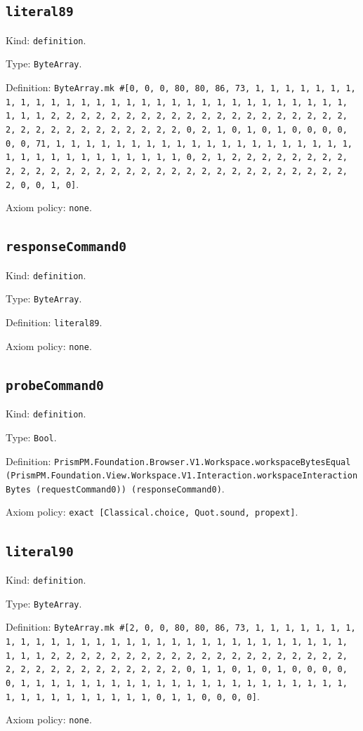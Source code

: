 \documentclass[11pt]{article}
\begin{document}
\subsection*{\texttt{literal89}}
\noindent Kind: \texttt{definition}.\par
\noindent Type: \texttt{ByteArray}.\par
\noindent Definition: \texttt{ByteArray.mk \#[0, 0, 0, 80, 80, 86, 73, 1, 1, 1, 1, 1, 1, 1, 1, 1, 1, 1, 1, 1, 1, 1, 1, 1, 1, 1, 1, 1, 1, 1, 1, 1, 1, 1, 1, 1, 1, 1, 1, 1, 2, 2, 2, 2, 2, 2, 2, 2, 2, 2, 2, 2, 2, 2, 2, 2, 2, 2, 2, 2, 2, 2, 2, 2, 2, 2, 2, 2, 2, 2, 2, 2, 0, 2, 1, 0, 1, 0, 1, 0, 0, 0, 0, 0, 0, 71, 1, 1, 1, 1, 1, 1, 1, 1, 1, 1, 1, 1, 1, 1, 1, 1, 1, 1, 1, 1, 1, 1, 1, 1, 1, 1, 1, 1, 1, 1, 1, 1, 0, 2, 1, 2, 2, 2, 2, 2, 2, 2, 2, 2, 2, 2, 2, 2, 2, 2, 2, 2, 2, 2, 2, 2, 2, 2, 2, 2, 2, 2, 2, 2, 2, 2, 2, 0, 0, 1, 0]}.\par
\noindent Axiom policy: \texttt{none}.\par
\subsection*{\texttt{responseCommand0}}
\noindent Kind: \texttt{definition}.\par
\noindent Type: \texttt{ByteArray}.\par
\noindent Definition: \texttt{literal89}.\par
\noindent Axiom policy: \texttt{none}.\par
\subsection*{\texttt{probeCommand0}}
\noindent Kind: \texttt{definition}.\par
\noindent Type: \texttt{Bool}.\par
\noindent Definition: \texttt{PrismPM.Foundation.Browser.V1.Workspace.workspaceBytesEqual (PrismPM.Foundation.View.Workspace.V1.Interaction.workspaceInteractionBytes (requestCommand0)) (responseCommand0)}.\par
\noindent Axiom policy: \texttt{exact [Classical.choice, Quot.sound, propext]}.\par
\subsection*{\texttt{literal90}}
\noindent Kind: \texttt{definition}.\par
\noindent Type: \texttt{ByteArray}.\par
\noindent Definition: \texttt{ByteArray.mk \#[2, 0, 0, 80, 80, 86, 73, 1, 1, 1, 1, 1, 1, 1, 1, 1, 1, 1, 1, 1, 1, 1, 1, 1, 1, 1, 1, 1, 1, 1, 1, 1, 1, 1, 1, 1, 1, 1, 1, 1, 2, 2, 2, 2, 2, 2, 2, 2, 2, 2, 2, 2, 2, 2, 2, 2, 2, 2, 2, 2, 2, 2, 2, 2, 2, 2, 2, 2, 2, 2, 2, 2, 0, 1, 1, 0, 1, 0, 1, 0, 0, 0, 0, 0, 1, 1, 1, 1, 1, 1, 1, 1, 1, 1, 1, 1, 1, 1, 1, 1, 1, 1, 1, 1, 1, 1, 1, 1, 1, 1, 1, 1, 1, 1, 1, 1, 0, 1, 1, 0, 0, 0, 0]}.\par
\noindent Axiom policy: \texttt{none}.\par
\end{document}
